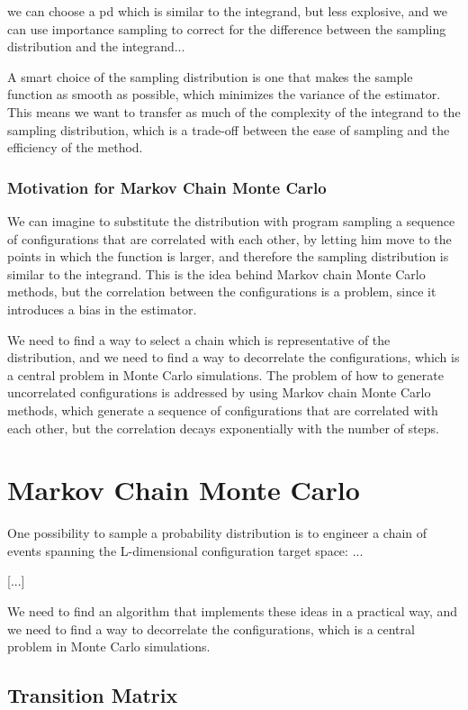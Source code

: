 we can choose a pd which is similar to the integrand, but less explosive, and we can use importance sampling to correct for the difference between the sampling distribution and the integrand...

A smart choice of the sampling distribution is one that makes the sample function as smooth as possible, which minimizes the variance of the estimator. This means we want to transfer as much of the complexity of the integrand to the sampling distribution, which is a trade-off between the ease of sampling and the efficiency of the method.

\subsubsection{Motivation for Markov Chain Monte Carlo}

We can imagine to substitute the distribution with program sampling a sequence of configurations that are correlated with each other, by letting him move to the points in which the function is larger, and therefore the sampling distribution is similar to the integrand. This is the idea behind Markov chain Monte Carlo methods, but the correlation between the configurations is a problem, since it introduces a bias in the estimator.

We need to find a way to select a chain which is representative of the distribution, and we need to find a way to decorrelate the configurations, which is a central problem in Monte Carlo simulations. The problem of how to generate uncorrelated configurations is addressed by using Markov chain Monte Carlo methods, which generate a sequence of configurations that are correlated with each other, but the correlation decays exponentially with the number of steps.

\section{Markov Chain Monte Carlo}

One possibility to sample a probability distribution is to engineer a chain of events spanning the L-dimensional configuration target space: ...

    [...]

We need to find an algorithm that implements these ideas in a practical way, and we need to find a way to decorrelate the configurations, which is a central problem in Monte Carlo simulations.

\subsection{Transition Matrix}

